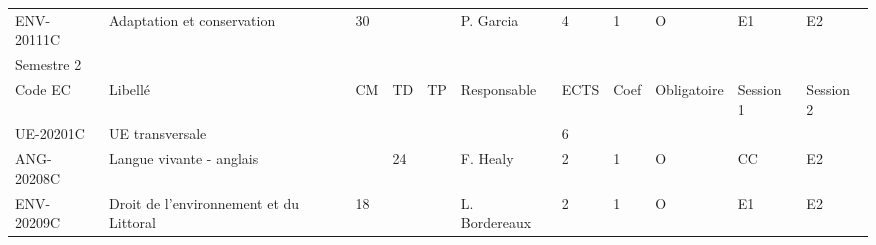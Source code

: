 \documentclass[a4paper,11pt]{article}
\begin{document}
{{\begin{tabular}{lllllllllll}
ENV-20111C                     & Adaptation et conservation                                                                & 30                        &                           &                           & P. Garcia                          & 4                           & 1                           & O                                  & E1                               & E2                               \\
\rowcolor[HTML]{656565} 
Semestre 2                     &                                                                                           &                           &                           &                           &                                    &                             &                             &                                    &                                  &                                  \\
\rowcolor[HTML]{9B9B9B} 
Code EC                        & Libellé                                                                                   & CM                        & TD                        & TP                        & Responsable                        & ECTS                        & Coef                        & Obligatoire                        & Session 1                        & Session 2                        \\
\rowcolor[HTML]{C0C0C0} 
UE-20201C                      & UE transversale                                                                           &                           &                           &                           &                                    & 6                           &                             &                                    &                                  &                                  \\
ANG-20208C                     & Langue vivante - anglais                                                                  &                           & 24                        &                           & F. Healy                           & 2                           & 1                           & O                                  & CC                               & E2                               \\
ENV-20209C                     & Droit de l'environnement et du Littoral                                                   & 18                        &                           &                           & L. Bordereaux                      & 2                           & 1                           & O                                  & E1                               & E2                               \\

\end{tabular}}}
\end{document}
